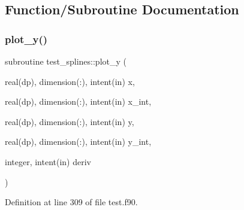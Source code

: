 \subsection{Function/\+Subroutine Documentation}
\mbox{\label{test_8f90_a197914f99b7e194fb4bca9ca3669e0e8}} 
\subsubsection{\texorpdfstring{plot\+\_\+y()}{plot\_y()}}
{\footnotesize\ttfamily subroutine test\+\_\+splines\+::plot\+\_\+y (\begin{DoxyParamCaption}\item[{real(dp), dimension(\+:), intent(in)}]{x,  }\item[{real(dp), dimension(\+:), intent(in)}]{x\+\_\+int,  }\item[{real(dp), dimension(\+:), intent(in)}]{y,  }\item[{real(dp), dimension(\+:), intent(in)}]{y\+\_\+int,  }\item[{integer, intent(in)}]{deriv }\end{DoxyParamCaption})}



Definition at line 309 of file test.\+f90.

